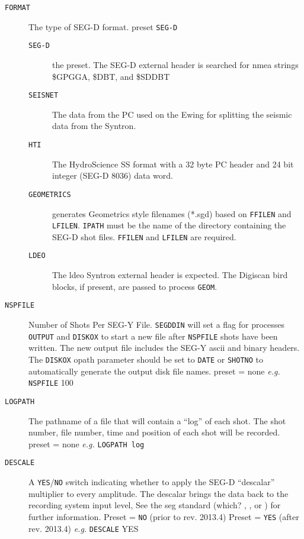 \begin{description}
\item[\texttt{FORMAT}] The type of SEG-D format.  \Gls{preset} \texttt{SEG-D}
\begin{description}
       \item[\texttt{SEG-D}] the preset.  The SEG-D external header is searched
       for \gls{nmea} strings \$GPGGA, \$DBT, and \$SDDBT
   \item[\texttt{SEISNET}]  The data from the PC used on the Ewing for splitting
       the seismic data from the Syntron.
   \item[\texttt{HTI}] The HydroScience SS format with a 32 byte PC header and
       24 bit integer (SEG-D 8036) data word.
   \item[\texttt{GEOMETRICS}] generates Geometrics style filenames (*.sgd) based
       on \texttt{FFILEN} and \texttt{LFILEN}.  \texttt{IPATH} must be the name of the directory
       containing the SEG-D \gls{shot} files.  \texttt{FFILEN} and \texttt{LFILEN} are required.
   \item[\texttt{LDEO}] The \gls{ldeo} Syntron external header is expected.  The
       Digiscan bird blocks, if present, are passed to process \texttt{GEOM}.
\end{description}

\item[\texttt{NSPFILE}] Number of Shots Per SEG-Y File.  \texttt{SEGDDIN} will set a flag for
          processes \texttt{OUTPUT} and \texttt{DISKOX} to start a new file after \texttt{NSPFILE}
          \glspl{shot} have been written.  The new output file includes the
          SEG-Y \gls{ascii} and binary headers.  The \texttt{DISKOX} opath parameter
          should be set to \texttt{DATE} or \texttt{SHOTNO} to automatically generate
          the output disk file names.
          \Gls{preset} = none      \textit{e.g.}    \texttt{NSPFILE} 100

\item[\texttt{LOGPATH}] The pathname of a file that will contain a ``log'' of each
          \gls{shot}.  The \gls{shot} number, file number, time and position of
          each \gls{shot} will be recorded.
          \Gls{preset} = none       \textit{e.g.}    \texttt{LOGPATH   log}

\item[\texttt{DESCALE}] A \texttt{YES}/\texttt{NO} switch indicating whether to apply the SEG-D
          ``descalar'' multiplier to every amplitude.  The descalar
          brings the data back to the recording system input
          level,  See the \gls{seg} standard (which? \cite{SEG_Y_r0}, \cite{SEG_Y_r1}, or \cite{SEG_Y_r2}) for further information.
          Preset = \texttt{NO}  (prior to rev. 2013.4)
          Preset = \texttt{YES} (after rev. 2013.4)
          \textit{e.g.}   \texttt{DESCALE} YES


\end{description}
